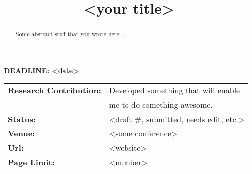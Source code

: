 


\title{<your title>}

\author{
}

\maketitle

\begin{center}
\Large\textbf{DEADLINE: <date>}
\end{center}
\begin{tabular}{ll}
\textbf{Research Contribution: }
&Developed something that will enable \\ %
&me to do something awesome. \\ 
\textbf{Status: }& <draft #, submitted, needs edit, etc.> \\
\textbf{Venue: }& <some conference> \\
\textbf{Url: }& <website> \\
\textbf{Page Limit: }& <number> \\
\end{tabular}

\IEEEpeerreviewmaketitle

\begin{abstract}
Some abstract stuff that you wrote here...
\end{abstract}

